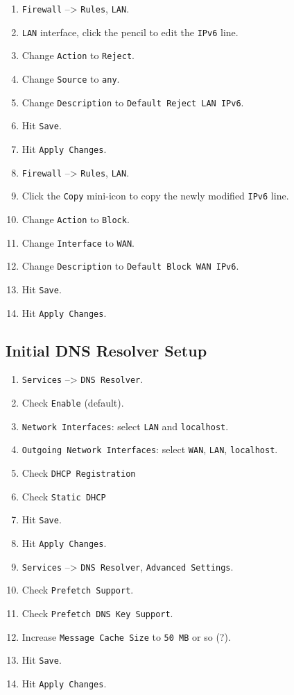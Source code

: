 \begin{enumerate}
 \item \texttt{Firewall} --> \texttt{Rules}, \texttt{LAN}.
 \item \texttt{LAN} interface, click the pencil to edit the \texttt{IPv6} line.
 \item Change \texttt{Action} to \texttt{Reject}.
 \item Change \texttt{Source} to \texttt{any}.
 \item Change \texttt{Description} to \texttt{Default Reject LAN IPv6}.
 \item Hit \texttt{Save}.
 \item Hit \texttt{Apply Changes}.
 \item \texttt{Firewall} --> \texttt{Rules}, \texttt{LAN}.
 \item Click the \texttt{Copy} mini-icon to copy the newly modified \texttt{IPv6} line.
 \item Change \texttt{Action} to \texttt{Block}.
 \item Change \texttt{Interface} to \texttt{WAN}.
 \item Change \texttt{Description} to \texttt{Default Block WAN IPv6}.
 \item Hit \texttt{Save}.
 \item Hit \texttt{Apply Changes}.
\end{enumerate}

\subsection{Initial DNS Resolver Setup}
\begin{enumerate}
 \item \texttt{Services} --> \texttt{DNS Resolver}.
 \item Check \texttt{Enable} (default).
 \item \texttt{Network Interfaces}: select \texttt{LAN} and \texttt{localhost}.
 \item \texttt{Outgoing Network Interfaces}: select \texttt{WAN}, \texttt{LAN}, \texttt{localhost}.
 \item Check \texttt{DHCP Registration}
 \item Check \texttt{Static DHCP}
 \item Hit \texttt{Save}.
 \item Hit \texttt{Apply Changes}.
 \item \texttt{Services} --> \texttt{DNS Resolver}, \texttt{Advanced Settings}.
 \item Check \texttt{Prefetch Support}.
 \item Check \texttt{Prefetch DNS Key Support}.
 \item Increase \texttt{Message Cache Size} to \texttt{50 MB} or so (?).
 \item Hit \texttt{Save}.
 \item Hit \texttt{Apply Changes}.
\end{enumerate}

